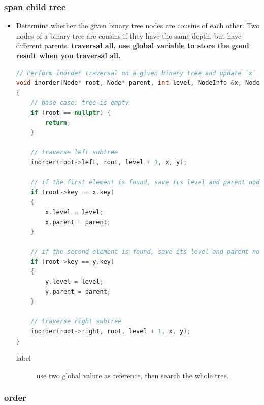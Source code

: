 \documentclass[a4paper,11pt,twoside]{book}
\begin{document}
\subsubsection{span child tree}
\begin{itemize}
	\item Determine whether the given binary tree nodes are cousins of each other. Two nodes of a binary tree are cousins if they have the same depth, but have different parents.   \textbf{traversal all, use global variable to store the good result when you traversal all. } 
\begin{lstlisting}[frame=single, language=c++]
// Perform inorder traversal on a given binary tree and update `x` and `y`
void inorder(Node* root, Node* parent, int level, NodeInfo &x, NodeInfo &y)
{
	// base case: tree is empty
	if (root == nullptr) {
		return;
	}
	
	// traverse left subtree
	inorder(root->left, root, level + 1, x, y);
	
	// if the first element is found, save its level and parent node
	if (root->key == x.key)
	{
		x.level = level;
		x.parent = parent;
	}
	
	// if the second element is found, save its level and parent node
	if (root->key == y.key)
	{
		y.level = level;
		y.parent = parent;
	}
	
	// traverse right subtree
	inorder(root->right, root, level + 1, x, y);
}
\end{lstlisting}
\begin{description}
	\item[label] use two global valure as reference, then search the whole tree. 
\end{description}

\end{itemize}

\subsubsection{order}
\end{document}
